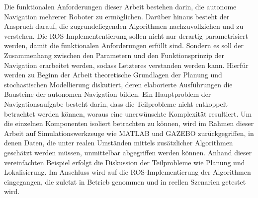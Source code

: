 Die funktionalen Anforderungen dieser Arbeit bestehen darin, die autonome Navigation mehrerer Roboter zu ermöglichen. Darüber hinaus besteht der Anspruch darauf, die zugrundeliegenden Algorithmen nachzuvollziehen und zu verstehen. Die ROS-Implemententierung sollen nicht nur derartig parametrisiert werden, damit die funktionalen Anforderungen erfüllt sind. Sondern es soll der Zusammenhang zwischen den Parametern und den Funktionsprinzip der Navigation erarbeitet werden, sodass Letzteres verstanden werden kann. Hierfür werden zu Beginn der Arbeit theoretische Grundlagen der Planung und stochastischen Modellierung diskutiert, deren elaborierte Ausführungen die Bausteine der autonomen Navigation bilden.
Ein Hauptproblem der Navigationsaufgabe besteht darin, dass die Teilprobleme nicht entkoppelt betrachtet werden können, woraus eine unerwünschte Komplexität resultiert. Um die einzelnen Komponenten isoliert betrachten zu können, wird im Rahmen dieser Arbeit auf Simulationswerkzeuge wie MATLAB und GAZEBO zurückgegriffen, in denen Daten, die unter realen Umständen mittels zusätzlicher Algorithmen geschätzt werden müssen, unmittelbar abgegriffen werden können. Anhand dieser vereinfachten Beispiel erfolgt die Diskussion der Teilprobleme wie Planung und Lokalisierung. Im Anschluss wird auf die ROS-Implementierung der Algorithmen eingegangen, die zuletzt in Betrieb genommen und in reellen Szenarien getestet wird.

